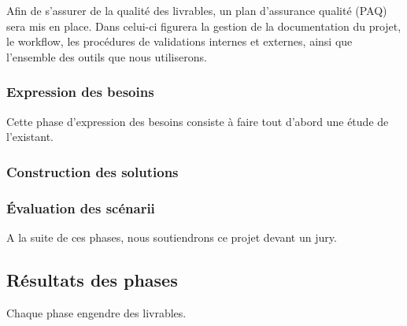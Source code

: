 \documentclass[a4paper,11pt]{report}
\begin{document}
Afin de s'assurer de la qualit\'e des livrables, un plan d'assurance qualit\'e (PAQ) sera mis en place. Dans celui-ci figurera la gestion de la documentation du projet,
le workflow, les proc\'edures de validations internes et externes, ainsi que l'ensemble des outils que nous utiliserons.

\subsubsection*{Expression des besoins}

Cette phase d'expression des besoins consiste \`a faire tout d'abord une \'etude de l'existant.
\subsubsection*{Construction des solutions}
\subsubsection*{\'Evaluation des sc\'enarii}

A la suite de ces phases, nous soutiendrons ce projet devant un jury.

\subsection*{R\'esultats des phases}

Chaque phase engendre des livrables.

\end{document}

